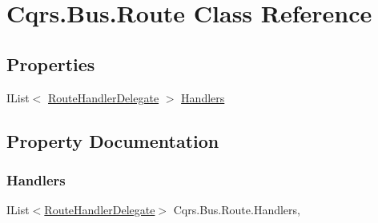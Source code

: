 \hypertarget{classCqrs_1_1Bus_1_1Route}{}\section{Cqrs.\+Bus.\+Route Class Reference}
\label{classCqrs_1_1Bus_1_1Route}
\subsection*{Properties}
\begin{DoxyCompactItemize}
\item 
I\+List$<$ \hyperlink{classCqrs_1_1Bus_1_1RouteHandlerDelegate}{Route\+Handler\+Delegate} $>$ \hyperlink{classCqrs_1_1Bus_1_1Route_ac82e93e4bb4667c9d1683d07c28d8b04_ac82e93e4bb4667c9d1683d07c28d8b04}{Handlers}
\end{DoxyCompactItemize}


\subsection{Property Documentation}
\mbox{\label{classCqrs_1_1Bus_1_1Route_ac82e93e4bb4667c9d1683d07c28d8b04_ac82e93e4bb4667c9d1683d07c28d8b04}} 
\subsubsection{\texorpdfstring{Handlers}{Handlers}}
{\footnotesize\ttfamily I\+List$<$\hyperlink{classCqrs_1_1Bus_1_1RouteHandlerDelegate}{Route\+Handler\+Delegate}$>$ Cqrs.\+Bus.\+Route.\+Handlers\hspace{0.3cm}{\ttfamily [get]}, {\ttfamily [set]}}


